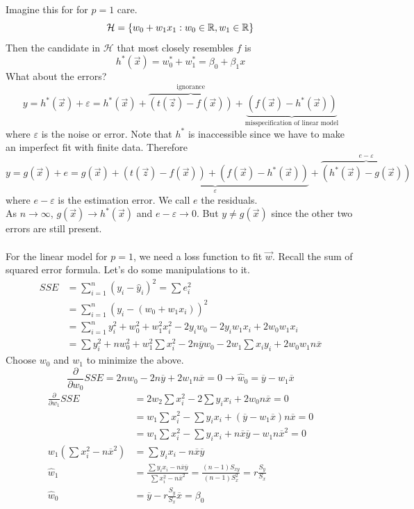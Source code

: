 \documentclass[12pt]{article}
\begin{document}
Imagine this for for $p = 1$ care. $$\mathcal{H} = \left\{ w_0 + w_1x_1: w_0 \in \mathbb{R}, w_1 \in \mathbb{R} \right\}$$ Then the candidate in $\mathcal{H}$ that most closely resembles $f$ is $$ h^*(\vec{x}) = w_0^* + w_1^* = \beta_0 + \beta_1x $$ 
What about the errors? 
$$ y = h^*(\vec{x}) + \varepsilon = h^*(\vec{x}) + \overbrace{(t(\vec{z}) - f(\vec{x}))}^{\text{ignorance}} + \underbrace{(f(\vec{x}) - h^*(\vec{x}))}_{\text{misspecification of linear model}} $$ 
where $\varepsilon$ is the noise or error. Note that $h^*$ is inaccessible since we have to make an imperfect fit with finite data. Therefore 
$$ y = g(\vec{x}) + e = g(\vec{x}) + \underbrace{(t(\vec{z}) - f(\vec{x})) + (f(\vec{x}) - h^*(\vec{x}))}_\varepsilon + \overbrace{(h^*(\vec{x}) - g(\vec{x}))}^{e - \varepsilon} $$ 
where $e - \varepsilon$ is the estimation error. We call $e$ the residuals. \\
As $n \to \infty$, $g(\vec{x}) \to h^*(\vec{x})$ and $e - \varepsilon \to 0$. But $y \neq g(\vec{x})$ since the other two errors are still present. \\~\\
For the linear model for $p=1$, we need a loss function to fit $\vec{w}$. Recall the sum of squared error formula. Let's do some manipulations to it. $$ \begin{aligned} 
SSE &= \sum_{i=1}^n (y_i - \hat{y}_i)^2 = \sum e_i^2 \\ &= \sum_{i=1}^n (y_i - (w_0 + w_1x_i))^2 \\ &= \sum_{i=1}^n y_i^2 + w_0^2 + w_1^2x_i^2 - 2y_iw_0 - 2y_iw_1x_i + 2w_0w_1x_i \\ &= \sum y_i^2 + nw_0^2 + w_1^2\sum x_i^2 - 2n\overline{y}w_0 - 2w_1\sum x_iy_i + 2w_0w_1n\overline{x} \end{aligned} $$ 
Choose $w_0$ and $w_1$ to minimize the above. 
$$ \frac{\partial}{\partial w_0} SSE = 2nw_0 - 2n\overline{y} + 2w_1n\overline{x} = 0 \to \hat{w}_0 = \overline{y} - w_1\overline{x} $$ 
$$ \begin{aligned} \frac{\partial}{\partial w_1} SSE &= 2w_2 \sum x_i^2 - 2\sum y_ix_i + 2w_0n\overline{x} = 0 \\ &= w_1\sum x_i^2 - \sum y_ix_i + (\overline{y} - w_1\overline{x})n\overline{x} = 0 \\ 
&= w_1\sum x_i^2- \sum y_ix_i + n\overline{x}\overline{y} - w_1n\overline{x}^2 = 0 \\ 
w_1(\sum x_i^2 - n\overline{x}^2) &= \sum y_ix_i - n\overline{x}\overline{y} \\
\hat{w}_1 &= \frac{\sum y_ix_i - n\overline{x}\overline{y}}{\sum x_i^2 - n\overline{x}^2} = \frac{(n-1)S_{xy}}{(n-1)S_x^2} = r\frac{S_y}{S_x} \\ \hat{w}_0 &= \overline{y} - r\frac{S_y}{S_x}\overline{x} = \beta_0 \end{aligned} $$
\end{document}
